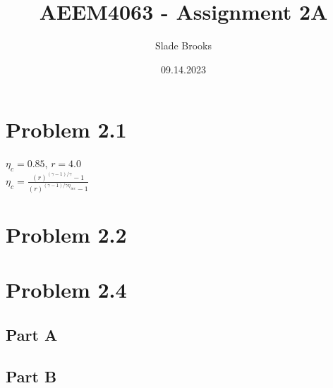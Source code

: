 \documentclass{article}
\title{AEEM4063 - Assignment 2A}
\author{Slade Brooks}
\date{09.14.2023}
\begin{document}
\maketitle

\section*{Problem 2.1}
$\eta_c = 0.85$, $r=4.0$ \\
$\eta_c = \frac{(r)^{(\gamma-1)/\gamma}-1}{(r)^{(\gamma-1)/\gamma\eta_{\infty c}}-1}$

\section*{Problem 2.2}

\section*{Problem 2.4}
\subsection*{Part A}
\subsection*{Part B}
\end{document}
